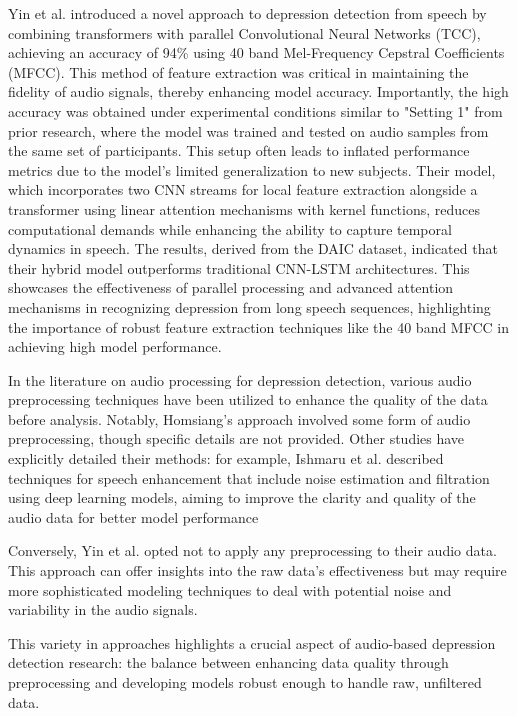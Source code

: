 Yin et al. \cite{yin2023depression} introduced a novel approach to depression detection from speech by combining transformers with parallel Convolutional Neural Networks (TCC), achieving an accuracy of 94\% using 40 band Mel-Frequency Cepstral Coefficients (MFCC). This method of feature extraction was critical in maintaining the fidelity of audio signals, thereby enhancing model accuracy. Importantly, the high accuracy was obtained under experimental conditions similar to "Setting 1" from prior research, where the model was trained and tested on audio samples from the same set of participants. This setup often leads to inflated performance metrics due to the model's limited generalization to new subjects. Their model, which incorporates two CNN streams for local feature extraction alongside a transformer using linear attention mechanisms with kernel functions, reduces computational demands while enhancing the ability to capture temporal dynamics in speech. The results, derived from the DAIC dataset, indicated that their hybrid model outperforms traditional CNN-LSTM architectures. This showcases the effectiveness of parallel processing and advanced attention mechanisms in recognizing depression from long speech sequences, highlighting the importance of robust feature extraction techniques like the 40 band MFCC in achieving high model performance.

In the literature on audio processing for depression detection, various audio preprocessing techniques have been utilized to enhance the quality of the data before analysis. Notably, Homsiang's approach involved some form of audio preprocessing, though specific details are not provided. Other studies have explicitly detailed their methods: for example, Ishmaru et al. described techniques for speech enhancement that include noise estimation and filtration using deep learning models, aiming to improve the clarity and quality of the audio data for better model performance\cite{kantamaneni2023speech}

Conversely, Yin et al. opted not to apply any preprocessing to their audio data. This approach can offer insights into the raw data's effectiveness but may require more sophisticated modeling techniques to deal with potential noise and variability in the audio signals.

This variety in approaches highlights a crucial aspect of audio-based depression detection research: the balance between enhancing data quality through preprocessing and developing models robust enough to handle raw, unfiltered data.